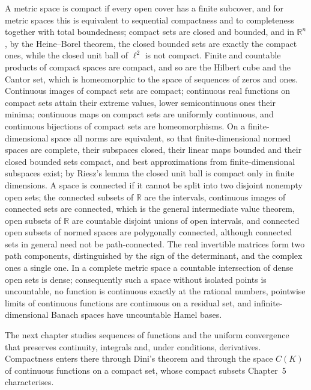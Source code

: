 \bigskip
A metric space is compact if every open cover has a finite subcover, and for metric spaces this is equivalent to sequential compactness and to completeness together with total boundedness; compact sets are closed and bounded, and in $\mathbb R^n$, by the Heine--Borel theorem, the closed bounded sets are exactly the compact ones, while the closed unit ball of $\ell^2$ is not compact. Finite and countable products of compact spaces are compact, and so are the Hilbert cube and the Cantor set, which is homeomorphic to the space of sequences of zeros and ones. Continuous images of compact sets are compact; continuous real functions on compact sets attain their extreme values, lower semicontinuous ones their minima; continuous maps on compact sets are uniformly continuous, and continuous bijections of compact sets are homeomorphisms. On a finite-dimensional space all norms are equivalent, so that finite-dimensional normed spaces are complete, their subspaces closed, their linear maps bounded and their closed bounded sets compact, and best approximations from finite-dimensional subspaces exist; by Riesz's lemma the closed unit ball is compact only in finite dimensions. A space is connected if it cannot be split into two disjoint nonempty open sets; the connected subsets of $\mathbb R$ are the intervals, continuous images of connected sets are connected, which is the general intermediate value theorem, open subsets of $\mathbb R$ are countable disjoint unions of open intervals, and connected open subsets of normed spaces are polygonally connected, although connected sets in general need not be path-connected. The real invertible matrices form two path components, distinguished by the sign of the determinant, and the complex ones a single one. In a complete metric space a countable intersection of dense open sets is dense; consequently such a space without isolated points is uncountable, no function is continuous exactly at the rational numbers, pointwise limits of continuous functions are continuous on a residual set, and infinite-dimensional Banach spaces have uncountable Hamel bases.

The next chapter studies sequences of functions and the uniform convergence that preserves continuity, integrals and, under conditions, derivatives. Compactness enters there through Dini's theorem and through the space $C(K)$ of continuous functions on a compact set, whose compact subsets Chapter~5 characterises.

\chapternotes

